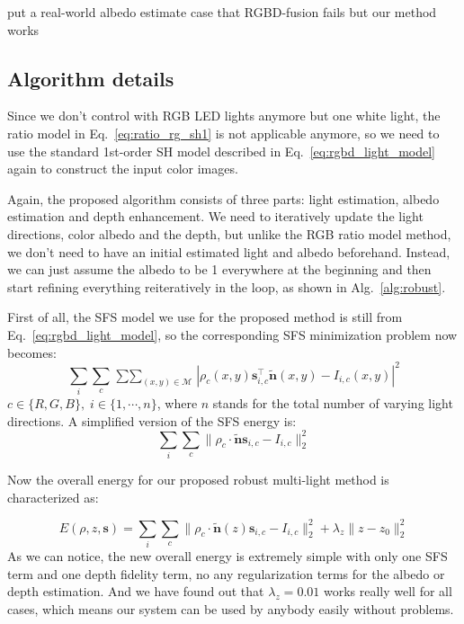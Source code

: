 {\color{red} put a real-world albedo estimate case that RGBD-fusion fails but our method works}


\subsection{Algorithm details}
Since we don't control with RGB LED lights anymore but one white light, the ratio model in Eq.~\ref{eq:ratio_rg_sh1} is not applicable anymore, so we need to use the standard 1st-order SH model described in Eq.~\ref{eq:rgbd_light_model} again to construct the input color images.

Again, the proposed algorithm consists of three parts: light estimation, albedo estimation and depth enhancement. 
We need to iteratively update the light directions, color albedo and the depth, but unlike the RGB ratio model method, we don't need to have an initial estimated light and albedo beforehand.
Instead, we can just assume the albedo to be 1 everywhere at the beginning and then start refining everything reiteratively in the loop, as shown in Alg.~\ref{alg:robust}.

First of all, the SFS model we use for the proposed method is still from Eq.~\ref{eq:rgbd_light_model}, so the corresponding SFS minimization problem now becomes:
\begin{equation}
    \sum_{i} \sum_{c} \mathop{\sum \sum}_{(x,y) \in \mathcal{M}} |\rho_c(x,y) \mathbf{s}_{i,c}^\top\tilde{\mathbf{n}}(x,y) - I_{i,c}(x,y)|^2 
\end{equation}
$c\in\{R,G,B\},\; i\in\{ 1, \cdots, n\}$, where $n$ stands for the total number of varying light directions.
A simplified version of the SFS energy is:
\begin{equation}
    \sum_{i} \sum_{c} \lVert\rho_c \cdot \tilde{\mathbf{n}}\mathbf{s}_{i,c} -  I_{i,c} \rVert_2^2 
\end{equation}

Now the overall energy for our proposed robust multi-light method is characterized as:

\begin{equation}\label{eq:robust_energy}
    E(\rho, z, \mathbf{s}) = \sum_{i} \sum_{c} \lVert \rho_c \cdot \tilde{\mathbf{n}}(z)\mathbf{s}_{i,c}  - I_{i,c}\rVert_2^2  + \lambda_{z}\lVert z - z_0 \rVert_2^2
\end{equation}
As we can notice, the new overall energy is extremely simple with only one SFS term and one depth fidelity term, no any regularization terms for the albedo or depth estimation.
And we have found out that $\lambda_z = 0.01$ works really well for all cases, which means our system can be used by anybody easily without problems.

